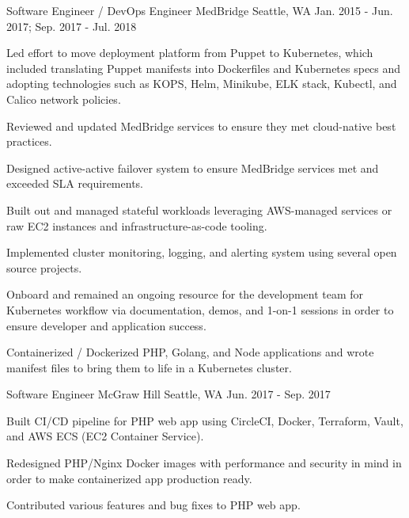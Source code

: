\begin{cventries}

\cventry
{Software Engineer / DevOps Engineer} %
{MedBridge} %
{Seattle, WA} %
{Jan. 2015 - Jun. 2017; Sep. 2017 - Jul. 2018} %
{ %
\begin{cvitems}
\item {Led effort to move deployment platform from Puppet to Kubernetes, which included translating Puppet manifests into Dockerfiles and Kubernetes specs and adopting technologies such as KOPS, Helm, Minikube, ELK stack, Kubectl, and Calico network policies.}
\item {Reviewed and updated MedBridge services to ensure they met cloud-native best practices.}
\item {Designed active-active failover system to ensure MedBridge services met and exceeded SLA requirements.}
\item {Built out and managed stateful workloads leveraging AWS-managed services or raw EC2 instances and infrastructure-as-code tooling.}
\item {Implemented cluster monitoring, logging, and alerting system using several open source projects.} 
\item {Onboard and remained an ongoing resource for the development team for Kubernetes workflow via documentation, demos, and 1-on-1 sessions in order to ensure developer and application success.}
\item {Containerized / Dockerized PHP, Golang, and Node applications and wrote manifest files to bring them to life in a Kubernetes cluster.}
\end{cvitems}
}


\cventry
{Software Engineer} %
{McGraw Hill} %
{Seattle, WA} %
{Jun. 2017 - Sep. 2017} %
{ %
\begin{cvitems}
\item {Built CI/CD pipeline for PHP web app using CircleCI, Docker, Terraform, Vault, and AWS ECS (EC2 Container Service).}
\item {Redesigned PHP/Nginx Docker images with performance and security in mind in order to make containerized app production ready.}
\item {Contributed various features and bug fixes to PHP web app.}
\end{cvitems}
}

\end{cventries}
